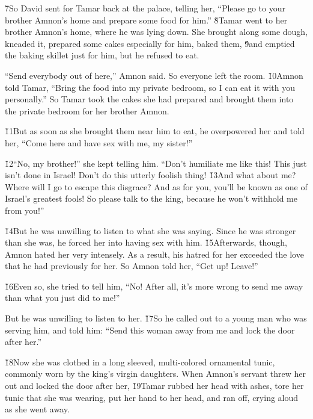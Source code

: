 \v{7}So David sent for Tamar back at the palace, telling her, ``Please go to your brother Amnon's home and prepare some food for him.'' \v{8}Tamar went to her brother Amnon's home, where he was lying down. She brought along some dough, kneaded it, prepared some cakes especially for him, baked them, \v{9}and emptied the baking skillet just for him, but he refused to eat.

``Send everybody out of here,'' Amnon said. So everyone left the room. \v{10}Amnon told Tamar, ``Bring the food into my private bedroom, so I can eat it with you personally.'' So Tamar took the cakes she had prepared and brought them into the private bedroom for her brother Amnon.

\v{11}But as soon as she brought them near him to eat, he overpowered her and told her, ``Come here and have sex with me, my sister!''

\v{12}``No, my brother!'' she kept telling him. ``Don't humiliate me like this! This just isn't done in Israel! Don't do this utterly foolish thing! \v{13}And what about me? Where will I go to escape this disgrace? And as for you, you'll be known as one of Israel's greatest fools! So please talk to the king, because he won't withhold me from you!''

\v{14}But he was unwilling to listen to what she was saying. Since he was stronger than she was, he forced her into having sex with him. \v{15}Afterwards, though, Amnon hated her very intensely. As a result, his hatred for her exceeded the love that he had previously for her. So Amnon told her, ``Get up! Leave!''

\v{16}Even so, she tried to tell him, ``No! After all, it's more wrong to send me away than what you just did to me!''

But he was unwilling to listen to her. \v{17}So he called out to a young man who was serving him, and told him: ``Send this woman away from me and lock the door after her.''

\v{18}Now she was clothed in a long sleeved, multi-colored ornamental tunic, commonly worn by the king's virgin daughters. When Amnon's servant threw her out and locked the door after her, \v{19}Tamar rubbed her head with ashes, tore her tunic that she was wearing, put her hand to her head, and ran off, crying aloud as she went away.

